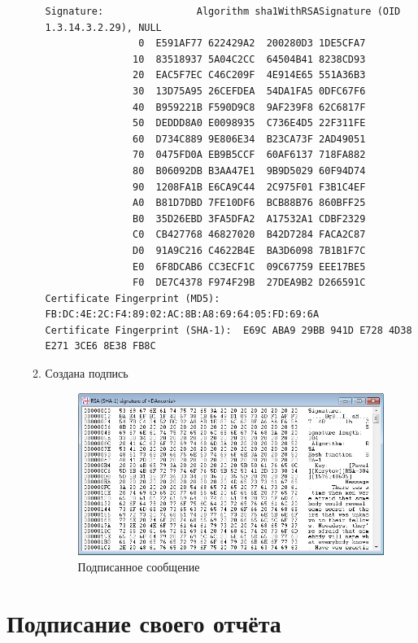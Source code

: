 \documentclass[a4paper, 14pt]{extarticle}
\begin{document}
\begin{enumerate}
\begin{enumerate}
\begin{lstlisting}[style=framed_num,caption=созданный сертификат]
Signature:                Algorithm sha1WithRSASignature (OID 1.3.14.3.2.29), NULL
                0  E591AF77 622429A2  200280D3 1DE5CFA7
               10  83518937 5A04C2CC  64504B41 8238CD93
               20  EAC5F7EC C46C209F  4E914E65 551A36B3
               30  13D75A95 26CEFDEA  54DA1FA5 0DFC67F6
               40  B959221B F590D9C8  9AF239F8 62C6817F
               50  DEDDD8A0 E0098935  C736E4D5 22F311FE
               60  D734C889 9E806E34  B23CA73F 2AD49051
               70  0475FD0A EB9B5CCF  60AF6137 718FA882
               80  B06092DB B3AA47E1  9B9D5029 60F94D74
               90  1208FA1B E6CA9C44  2C975F01 F3B1C4EF
               A0  B81D7DBD 7FE10DF6  BCB88B76 860BFF25
               B0  35D26EBD 3FA5DFA2  A17532A1 CDBF2329
               C0  CB427768 46827020  B42D7284 FACA2C87
               D0  91A9C216 C4622B4E  BA3D6098 7B1B1F7C
               E0  6F8DCAB6 CC3ECF1C  09C67759 EEE17BE5
               F0  DE7C4378 F974F29B  27DEA9B2 D266591C
Certificate Fingerprint (MD5):    FB:DC:4E:2C:F4:89:02:AC:8B:A8:69:64:05:FD:69:6A
Certificate Fingerprint (SHA-1):  E69C ABA9 29BB 941D E728 4D38 E271 3CE6 8E38 FB8C
        \end{lstlisting}
        \item Создана подпись
        \begin{figure}[h]
            \centering
            \includegraphics[width=\textwidth]{img/S015.jpg}
            \caption{Подписанное сообщение}%
        \end{figure}
        \FloatBarrier{}
        
    \end{enumerate}
\end{enumerate}

\section{Подписание своего отчёта}
\end{document}
